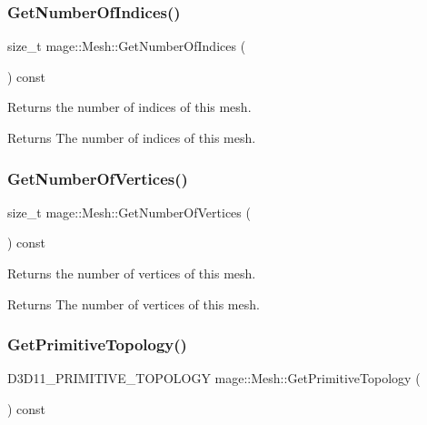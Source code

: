 \subsubsection{\texorpdfstring{Get\+Number\+Of\+Indices()}{GetNumberOfIndices()}}
{\footnotesize\ttfamily size\+\_\+t mage\+::\+Mesh\+::\+Get\+Number\+Of\+Indices (\begin{DoxyParamCaption}{ }\end{DoxyParamCaption}) const}

Returns the number of indices of this mesh.

\begin{DoxyReturn}{Returns}
The number of indices of this mesh. 
\end{DoxyReturn}
\hypertarget{classmage_1_1_mesh_a47732f4ac48000c2a1f5562bdba38a81}{}\label{classmage_1_1_mesh_a47732f4ac48000c2a1f5562bdba38a81} 
\subsubsection{\texorpdfstring{Get\+Number\+Of\+Vertices()}{GetNumberOfVertices()}}
{\footnotesize\ttfamily size\+\_\+t mage\+::\+Mesh\+::\+Get\+Number\+Of\+Vertices (\begin{DoxyParamCaption}{ }\end{DoxyParamCaption}) const}

Returns the number of vertices of this mesh.

\begin{DoxyReturn}{Returns}
The number of vertices of this mesh. 
\end{DoxyReturn}
\hypertarget{classmage_1_1_mesh_a3628c67de9562e31a8266a51776c903a}{}\label{classmage_1_1_mesh_a3628c67de9562e31a8266a51776c903a} 
\subsubsection{\texorpdfstring{Get\+Primitive\+Topology()}{GetPrimitiveTopology()}}
{\footnotesize\ttfamily D3\+D11\+\_\+\+P\+R\+I\+M\+I\+T\+I\+V\+E\+\_\+\+T\+O\+P\+O\+L\+O\+GY mage\+::\+Mesh\+::\+Get\+Primitive\+Topology (\begin{DoxyParamCaption}{ }\end{DoxyParamCaption}) const}

